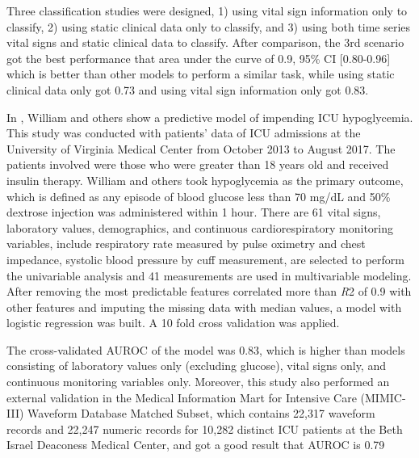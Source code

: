 \documentclass[12pt,a4paper,english
]{tunithesis}
\begin{document}
Three classification studies were designed, 1) using vital sign information only to classify, 2) using static clinical data only to classify, and 3) using both time series vital signs and static clinical data to classify. After comparison, the 3rd scenario got the best performance that area under the curve of 0.9, 95\% CI [0.80-0.96] which is better than other models to perform a similar task, while using static clinical data only got 0.73 and using vital sign information only got 0.83.

In \textcite{horton2022}, William and others show a predictive model of impending ICU hypoglycemia. This study was conducted with patients' data of ICU admissions at the University of Virginia Medical Center from October 2013 to August 2017. The patients involved were those who were greater than 18 years old and received insulin therapy. William and others took hypoglycemia as the primary outcome, which is defined as any episode of blood glucose less than 70 mg/dL and 50\% dextrose injection was administered within 1 hour. There are 61 vital signs, laboratory values, demographics, and continuous cardiorespiratory monitoring variables, include respiratory rate measured by pulse oximetry and chest impedance, systolic blood pressure by cuff measurement, are selected to perform the univariable analysis and 41 measurements are used in multivariable modeling. After removing the most predictable features correlated more than \textit{R}2 of 0.9 with other features and imputing the missing data with median values, a model with logistic regression was built. A 10 fold cross validation was applied. 

The cross-validated AUROC of the model  was 0.83, which is higher than models consisting of laboratory values only (excluding glucose), vital signs only, and continuous monitoring variables only. Moreover, this study also performed an external validation in the Medical Information Mart for Intensive Care (MIMIC-III) Waveform Database Matched Subset, which contains 22,317 waveform records and 22,247 numeric records for 10,282 distinct ICU patients at the Beth Israel Deaconess Medical Center, and got a good result that AUROC is 0.79
\end{document}
